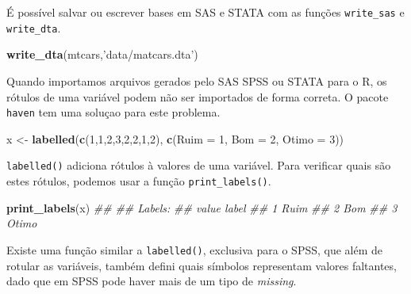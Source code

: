 \documentclass[]{book}
\newenvironment{Shaded}{\begin{snugshade}}{\end{snugshade}}
\newcommand{\CommentTok}[1]{\textcolor[rgb]{0.56,0.35,0.01}{\textit{#1}}}
\newcommand{\DataTypeTok}[1]{\textcolor[rgb]{0.13,0.29,0.53}{#1}}
\newcommand{\DecValTok}[1]{\textcolor[rgb]{0.00,0.00,0.81}{#1}}
\newcommand{\KeywordTok}[1]{\textcolor[rgb]{0.13,0.29,0.53}{\textbf{#1}}}
\newcommand{\NormalTok}[1]{#1}
\newcommand{\StringTok}[1]{\textcolor[rgb]{0.31,0.60,0.02}{#1}}
\begin{document}
É possível salvar ou escrever bases em SAS e STATA com as funções \texttt{write\_sas} e \texttt{write\_dta}.

\begin{Shaded}
\begin{Highlighting}[]
\KeywordTok{write_dta}\NormalTok{(mtcars,}\StringTok{'data/matcars.dta'}\NormalTok{)}
\end{Highlighting}
\end{Shaded}

Quando importamos arquivos gerados pelo SAS SPSS ou STATA para o R, os rótulos de uma variável podem não ser importados de forma correta. O pacote \texttt{haven} tem uma soluçao para este problema.

\begin{Shaded}
\begin{Highlighting}[]
\NormalTok{x <-}\StringTok{ }\KeywordTok{labelled}\NormalTok{(}\KeywordTok{c}\NormalTok{(}\DecValTok{1}\NormalTok{,}\DecValTok{1}\NormalTok{,}\DecValTok{2}\NormalTok{,}\DecValTok{3}\NormalTok{,}\DecValTok{2}\NormalTok{,}\DecValTok{2}\NormalTok{,}\DecValTok{1}\NormalTok{,}\DecValTok{2}\NormalTok{), }\KeywordTok{c}\NormalTok{(}\DataTypeTok{Ruim =} \DecValTok{1}\NormalTok{, }\DataTypeTok{Bom =} \DecValTok{2}\NormalTok{, }\DataTypeTok{Otimo =} \DecValTok{3}\NormalTok{))}
\end{Highlighting}
\end{Shaded}

\texttt{labelled()} adiciona rótulos à valores de uma variável. Para verificar quais são estes rótulos, podemos usar a função \texttt{print\_labels()}.

\begin{Shaded}
\begin{Highlighting}[]
\KeywordTok{print_labels}\NormalTok{(x)}
\CommentTok{## }
\CommentTok{## Labels:}
\CommentTok{##  value label}
\CommentTok{##      1  Ruim}
\CommentTok{##      2   Bom}
\CommentTok{##      3 Otimo}
\end{Highlighting}
\end{Shaded}

Existe uma função similar a \texttt{labelled()}, exclusiva para o SPSS, que além de rotular as variáveis, também defini quais símbolos representam valores faltantes, dado que em SPSS pode haver mais de um tipo de \emph{missing}.
\end{document}
